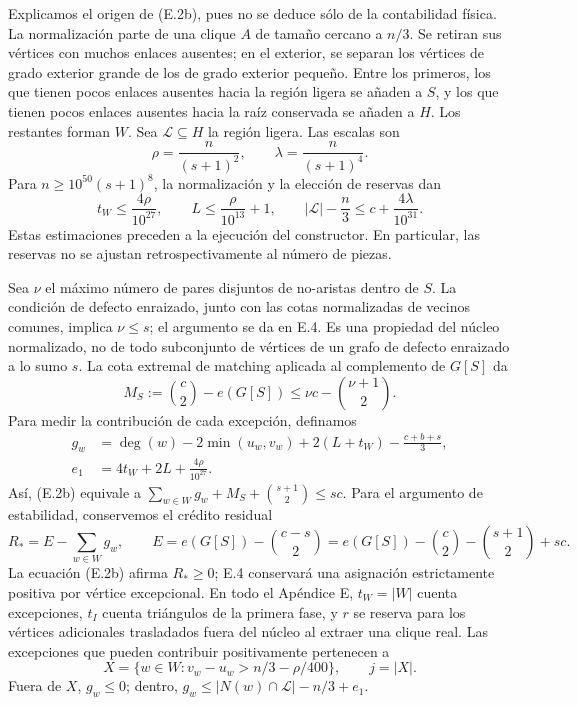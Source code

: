 \documentclass[spanish,11pt,a4paper]{article}
\begin{document}
Explicamos el origen de (E.2b), pues no se deduce sólo de la contabilidad física. La normalización parte de una clique \(A\) de tamaño cercano a \(n/3\). Se retiran sus vértices con muchos enlaces ausentes; en el exterior, se separan los vértices de grado exterior grande de los de grado exterior pequeño. Entre los primeros, los que tienen pocos enlaces ausentes hacia la región ligera se añaden a \(S\), y los que tienen pocos enlaces ausentes hacia la raíz conservada se añaden a \(H\). Los restantes forman \(W\). Sea \(\mathcal L\subseteq H\) la región ligera. Las escalas son \[
\rho=\frac{n}{(s+1)^2},\qquad \lambda=\frac{n}{(s+1)^4}.
\] Para \(n\ge10^{50}(s+1)^8\), la normalización y la elección de reservas dan \[
t_W\le\frac{4\rho}{10^{27}},\qquad
L\le\frac{\rho}{10^{13}}+1,\qquad
|\mathcal L|-\frac n3\le c+\frac{4\lambda}{10^{31}}.
\] Estas estimaciones preceden a la ejecución del constructor. En particular, las reservas no se ajustan retrospectivamente al número de piezas.

Sea \(\nu\) el máximo número de pares disjuntos de no-aristas dentro de \(S\). La condición de defecto enraizado, junto con las cotas normalizadas de vecinos comunes, implica \(\nu\le s\); el argumento se da en E.4. Es una propiedad del núcleo normalizado, no de todo subconjunto de vértices de un grafo de defecto enraizado a lo sumo \(s\). La cota extremal de matching aplicada al complemento de \(G[S]\) da \[
M_S:=\binom c2-e(G[S])\le \nu c-\binom{\nu+1}2.
\] Para medir la contribución de cada excepción, definamos \[
\begin{split}
g_w&=\deg(w)-2\min(u_w,v_w)+2(L+t_W)-\frac{c+b+s}{3},\\
e_1&=4t_W+2L+\frac{4\rho}{10^{27}}.
\end{split}
\] Así, (E.2b) equivale a \(\sum_{w\in W}g_w+M_S+\binom{s+1}2\le sc\). Para el argumento de estabilidad, conservemos el crédito residual \[
R_*=E-\sum_{w\in W}g_w,\qquad
E=e(G[S])-\binom{c-s}{2}
  =e(G[S])-\binom c2-\binom{s+1}2+sc.
\] La ecuación (E.2b) afirma \(R_*\ge0\); E.4 conservará una asignación estrictamente positiva por vértice excepcional. En todo el Apéndice E, \(t_W=|W|\) cuenta excepciones, \(t_I\) cuenta triángulos de la primera fase, y \(r\) se reserva para los vértices adicionales trasladados fuera del núcleo al extraer una clique real. Las excepciones que pueden contribuir positivamente pertenecen a \[
X=\{w\in W:v_w-u_w>n/3-\rho/400\},\qquad j=|X|.
\] Fuera de \(X\), \(g_w\le0\); dentro, \(g_w\le |N(w)\cap\mathcal L|-n/3+e_1\).
\end{document}
